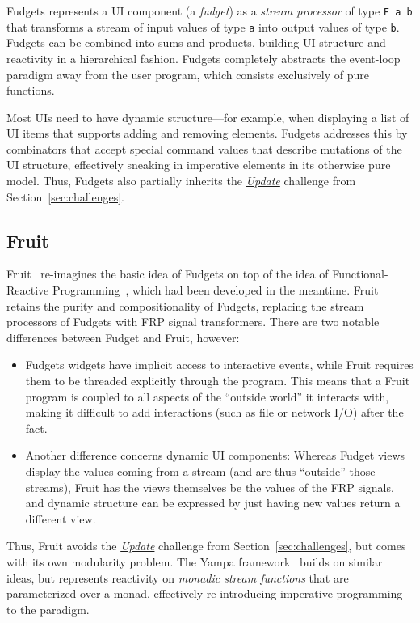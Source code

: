 \documentclass[sigplan,review,screen]{acmart}
\begin{document}
Fudgets represents a UI component (a \textit{fudget}) as a
\textit{stream processor} of type \verb|F a b| that transforms a
stream of input values of type \texttt{a} into output values of type
\texttt{b}.  Fudgets can be combined into sums and products, building
UI structure and reactivity in a hierarchical fashion.  Fudgets
completely abstracts the event-loop paradigm away from the user
program, which consists exclusively of pure functions.

Most UIs
need to have dynamic structure---for example, when
displaying a list of UI items that supports adding and removing
elements.  Fudgets addresses this by combinators that accept special
command values that describe mutations of the UI structure,
effectively sneaking in imperative elements in its otherwise pure
model.  Thus, Fudgets also partially inherits the \hyperlink{challenge:update}{\textit{Update}} challenge from
Section~\ref{sec:challenges}.

\subsection{Fruit}

Fruit~\cite{Fruit} re-imagines the basic idea of Fudgets on top of the
idea of Functional-Reactive Programming~\cite{FRP}, which had been
developed in the meantime.  Fruit retains the purity and
compositionality of Fudgets,  replacing the stream processors of
Fudgets with FRP signal transformers.  There are two notable
differences between Fudget and Fruit, however:
\begin{itemize}
\item Fudgets widgets have implicit access to interactive events,
  while Fruit requires them to be threaded explicitly through the
  program.  This means that a Fruit program is coupled to all aspects
  of the ``outside world'' it interacts with, making it difficult to
  add interactions (such as file or network I/O) after
  the fact.
\item Another difference concerns dynamic UI components:
  Whereas Fudget views display the values coming from a
  stream (and are thus ``outside'' those streams), Fruit has the views
  themselves be the values of the FRP signals, and dynamic structure
  can be expressed by just having new values return a different view.
\end{itemize}
%
Thus, Fruit avoids the \hyperlink{challenge:update}{\textit{Update}} challenge from Section~\ref{sec:challenges},
but comes with its own modularity problem.  The Yampa framework~\cite{Yampa} builds
on similar ideas, but represents reactivity on \textit{monadic stream
  functions} that are parameterized over a monad, effectively re-introducing
imperative programming to the paradigm.
\end{document}
